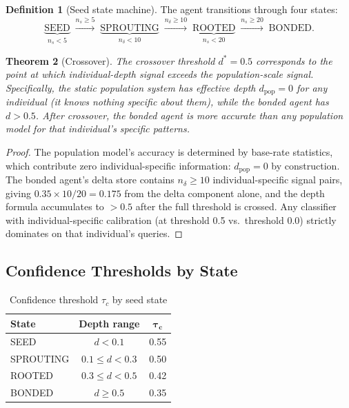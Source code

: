 \documentclass[12pt,a4paper]{article}
\theoremstyle{plain}
\newtheorem{theorem}{Theorem}[section]
\theoremstyle{definition}
\newtheorem{definition}[theorem]{Definition}
\theoremstyle{remark}
\begin{document}
\begin{definition}[Seed state machine]
The agent transitions through four states:
\begin{equation}
\underbrace{\mathrm{SEED}}_{n_s < 5}
\;\xrightarrow{n_s \geq 5}\;
\underbrace{\mathrm{SPROUTING}}_{n_\delta < 10}
\;\xrightarrow{n_\delta \geq 10}\;
\underbrace{\mathrm{ROOTED}}_{n_s < 20}
\;\xrightarrow{n_s \geq 20}\;
\mathrm{BONDED}.
\end{equation}
\end{definition}

\begin{theorem}[Crossover]
\label{thm:crossover}
The crossover threshold $d^* = 0.5$ corresponds to the point at which
individual-depth signal exceeds the population-scale signal.
Specifically, the static population system has effective depth
$d_{\text{pop}} = 0$ for any individual (it knows nothing specific
about them), while the bonded agent has $d > 0.5$.  After crossover,
the bonded agent is more accurate than any population model for that
individual's specific patterns.
\end{theorem}

\begin{proof}
The population model's accuracy is determined by base-rate statistics,
which contribute zero individual-specific information:
$d_{\text{pop}} = 0$ by construction.  The bonded agent's delta store
contains $n_\delta \geq 10$ individual-specific signal pairs, giving
$0.35 \times 10/20 = 0.175$ from the delta component alone, and the
depth formula accumulates to $> 0.5$ after the full threshold is crossed.
Any classifier with individual-specific calibration (at threshold 0.5
vs.\ threshold 0.0) strictly dominates on that individual's queries.
\end{proof}

\subsection{Confidence Thresholds by State}

\begin{table}[H]
\centering
\caption{Confidence threshold $\tau_c$ by seed state}
\label{tab:confidence}
\renewcommand{\arraystretch}{1.2}
\begin{tabular}{lcc}
\toprule
\textbf{State} & \textbf{Depth range} & $\boldsymbol{\tau_c}$ \\
\midrule
SEED       & $d < 0.1$  & 0.55 \\
SPROUTING  & $0.1 \leq d < 0.3$ & 0.50 \\
ROOTED     & $0.3 \leq d < 0.5$ & 0.42 \\
BONDED     & $d \geq 0.5$       & 0.35 \\
\bottomrule
\end{tabular}
\end{table}
\end{document}
